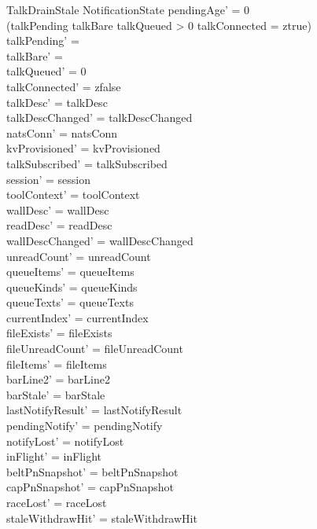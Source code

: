 \documentclass[a4paper,10pt,fleqn]{article}
\begin{document}
\begin{schema}{TalkDrainStale}
  \Delta NotificationState
  \where
  pendingAge' = 0 \\
  (\dom talkPending \neq \emptyset \lor talkBare \neq \emptyset \lor
  talkQueued > 0 \lor talkConnected = ztrue) \\
  talkPending' = \emptyset \\
  talkBare' = \emptyset \\
  talkQueued' = 0 \\
  talkConnected' = zfalse \\
  talkDesc' = talkDesc \\
  talkDescChanged' = talkDescChanged \\
  natsConn' = natsConn \\
  kvProvisioned' = kvProvisioned \\
  talkSubscribed' = talkSubscribed \\
  session' = session \\
  toolContext' = toolContext \\
  wallDesc' = wallDesc \\
  readDesc' = readDesc \\
  wallDescChanged' = wallDescChanged \\
  unreadCount' = unreadCount \\
  queueItems' = queueItems \\
  queueKinds' = queueKinds \\
  queueTexts' = queueTexts \\
  currentIndex' = currentIndex \\
  fileExists' = fileExists \\
  fileUnreadCount' = fileUnreadCount \\
  fileItems' = fileItems \\
  barLine2' = barLine2 \\
  barStale' = barStale \\
  lastNotifyResult' = lastNotifyResult \\
  pendingNotify' = pendingNotify \\
  notifyLost' = notifyLost \\
  inFlight' = inFlight \\
  beltPnSnapshot' = beltPnSnapshot \\
  capPnSnapshot' = capPnSnapshot \\
  raceLost' = raceLost \\
  staleWithdrawHit' = staleWithdrawHit \\

\end{schema}
\end{document}
